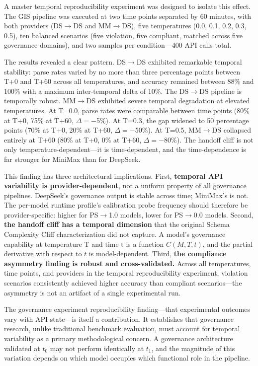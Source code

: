 \documentclass[11pt,a4paper]{article}
\begin{document}
A master temporal reproducibility experiment was designed to isolate this effect. The GIS pipeline was executed at two time points separated by 60 minutes, with both providers (DS$\rightarrow$DS and MM$\rightarrow$DS), five temperatures (0.0, 0.1, 0.2, 0.3, 0.5), ten balanced scenarios (five violation, five compliant, matched across five governance domains), and two samples per condition---400 API calls total.

The results revealed a clear pattern. DS$\rightarrow$DS exhibited remarkable temporal stability: parse rates varied by no more than three percentage points between T+0 and T+60 across all temperatures, and accuracy remained between 88\% and 100\% with a maximum inter-temporal delta of 10\%. The DS$\rightarrow$DS pipeline is temporally robust. MM$\rightarrow$DS exhibited severe temporal degradation at elevated temperatures. At T=0.0, parse rates were comparable between time points (80\% at T+0, 75\% at T+60, $\Delta$$=-$5\%). At T=0.3, the gap widened to 50 percentage points (70\% at T+0, 20\% at T+60, $\Delta$$=-$50\%). At T=0.5, MM$\rightarrow$DS collapsed entirely at T+60 (80\% at T+0, 0\% at T+60, $\Delta$$=-$80\%). The handoff cliff is not only temperature-dependent---it is time-dependent, and the time-dependence is far stronger for MiniMax than for DeepSeek.

This finding has three architectural implications. First, \textbf{temporal API variability is provider-dependent}, not a uniform property of all governance pipelines. DeepSeek's governance output is stable across time; MiniMax's is not. The per-model runtime profile's calibration probe frequency should therefore be provider-specific: higher for PS$\rightarrow$1.0 models, lower for PS$\rightarrow$0.0 models. Second, \textbf{the handoff cliff has a temporal dimension} that the original Schema Complexity Cliff characterization did not capture. A model's governance capability at temperature T and time t is a function $C(M, T, t)$, and the partial derivative with respect to $t$ is model-dependent. Third, \textbf{the compliance asymmetry finding is robust and cross-validated.} Across all temperatures, time points, and providers in the temporal reproducibility experiment, violation scenarios consistently achieved higher accuracy than compliant scenarios---the asymmetry is not an artifact of a single experimental run.

The governance experiment reproducibility finding---that experimental outcomes vary with API state---is itself a contribution. It establishes that governance research, unlike traditional benchmark evaluation, must account for temporal variability as a primary methodological concern. A governance architecture validated at $t_0$ may not perform identically at $t_1$, and the magnitude of this variation depends on which model occupies which functional role in the pipeline.
\end{document}
